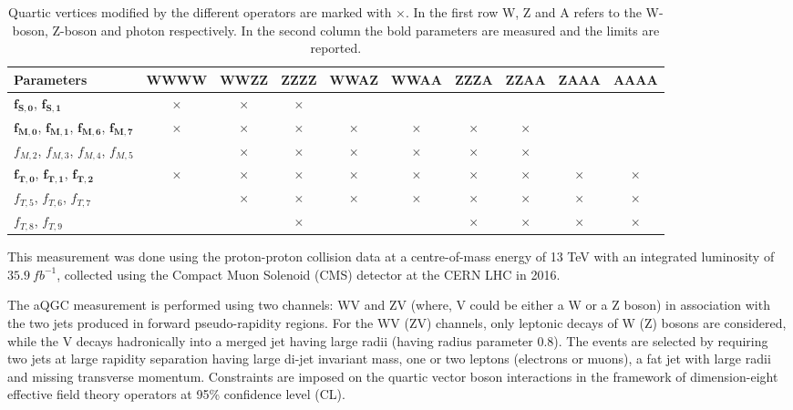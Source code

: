 \begin{table}
\centering
{\scriptsize
\begin{tabular}[!htbp]{|l | c  |c  |c  |c  |c  |c  |c | c  |c |}
\hline
 Parameters   & WWWW & WWZZ & ZZZZ & WWAZ & WWAA & ZZZA & ZZAA & ZAAA & AAAA \\
\hline
$\bm{f_{S,0}}$, $\bm{f_{S,1}}$ &$\bm{\times}$ & $\bm{\times}$&$\bm{\times}$ & & & & & & \\
\hline
$\bm{f_{M,0}}$, $\bm{f_{M,1}}$, $\bm{f_{M,6}}$, $\bm{f_{M,7}}$  &$\bm{\times}$ &$\bm{\times}$ &$\bm{\times}$ &$\bm{\times}$ &$\bm{\times}$ &$\bm{\times}$ &$\bm{\times}$ & & \\
\hline
$f_{M,2}$, $f_{M,3}$, $f_{M,4}$, $f_{M,5}$  & &$\times$ &$\times$ &$\times$ &$\times$ &$\times$ &$\times$ & & \\
\hline
$\bm{f_{T,0}}$, $\bm{f_{T,1}}$, $\bm{f_{T,2}}$ &$\bm{\times}$ &$\bm{\times}$ &$\bm{\times}$ &$\bm{\times}$ &$\bm{\times}$ &$\bm{\times}$ &$\bm{\times}$ &$\bm{\times}$ &$\bm{\times}$ \\
\hline
$f_{T,5}$, $f_{T,6}$, $f_{T,7}$ & &$\times$ &$\times$ &$\times$ &$\times$ &$\times$ &$\times$ &$\times$ &$\times$ \\
\hline
$f_{T,8}$, $f_{T,9}$  & & &$\times$ & & &$\times$ &$\times$ &$\times$ &$\times$ \\
\hline
\end{tabular}
\caption{Quartic vertices modified by the different operators are marked with $\times$. In the first row W, Z and A refers to the W-boson, Z-boson and photon respectively. In the second column the bold parameters are measured and the limits are reported.}
\label{table:aQGC_alloperator}}
\end{table}
%
This measurement was done using the proton-proton collision data at a centre-of-mass energy of 13 TeV with an integrated luminosity of $35.9~fb^{-1}$, collected using the Compact Muon Solenoid (CMS) detector at the CERN LHC in 2016.

The aQGC measurement is performed using two channels: WV and ZV (where, V could be either a W or a Z boson) in association with the two jets produced in forward pseudo-rapidity regions. For the WV (ZV) channels, only leptonic decays of W (Z) bosons are considered, while the V decays hadronically into a merged jet having large radii (having radius parameter 0.8). The events are selected by requiring two jets at large rapidity separation having large di-jet invariant mass, one or two leptons (electrons or muons), a fat jet with large radii and missing transverse momentum. Constraints are imposed on the quartic vector boson interactions in the framework of dimension-eight effective field theory operators at 95\% confidence level (CL).

